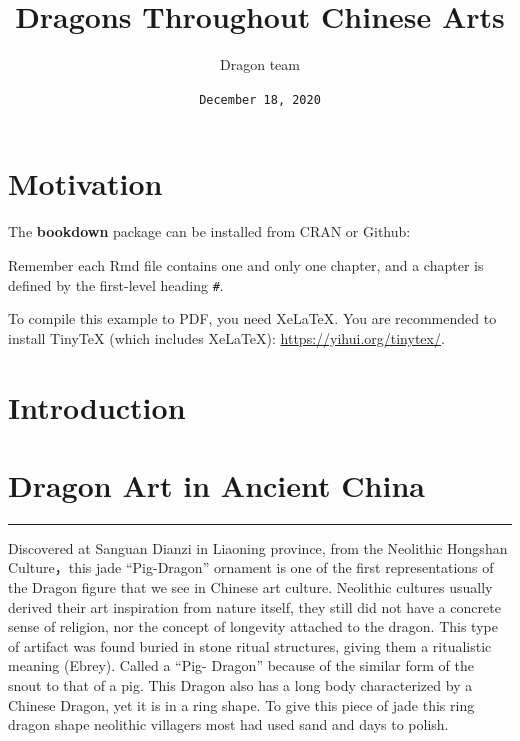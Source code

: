 \documentclass[
]{book}
\title{Dragons Throughout Chinese Arts}
\author{Dragon team}
\date{\texttt{December\ 18,\ 2020}}
\begin{document}
\maketitle

{
\setcounter{tocdepth}{1}
\tableofcontents
}
\hypertarget{motivation}{%
\chapter*{Motivation}\label{motivation}}

The \textbf{bookdown} package can be installed from CRAN or Github:

Remember each Rmd file contains one and only one chapter, and a chapter is defined by the first-level heading \texttt{\#}.

To compile this example to PDF, you need XeLaTeX. You are recommended to install TinyTeX (which includes XeLaTeX): \url{https://yihui.org/tinytex/}.

\hypertarget{intro}{%
\chapter*{Introduction}\label{intro}}

\hypertarget{ancient}{%
\chapter*{Dragon Art in Ancient China}\label{ancient}}

\begin{center}\rule{0.5\linewidth}{0.5pt}\end{center}

Discovered at Sanguan Dianzi in Liaoning province, from the Neolithic Hongshan Culture，this jade ``Pig-Dragon'' ornament is one of the first representations of the Dragon figure that we see in Chinese art culture. Neolithic cultures usually derived their art inspiration from nature itself, they still did not have a concrete sense of religion, nor the concept of longevity attached to the dragon. This type of artifact was found buried in stone ritual structures, giving them a ritualistic meaning (Ebrey).
Called a ``Pig- Dragon'' because of the similar form of the snout to that of a pig. This Dragon also has a long body characterized by a Chinese Dragon, yet it is in a ring shape. To give this piece of jade this ring dragon shape neolithic villagers most had used sand and days to polish.
\end{document}
